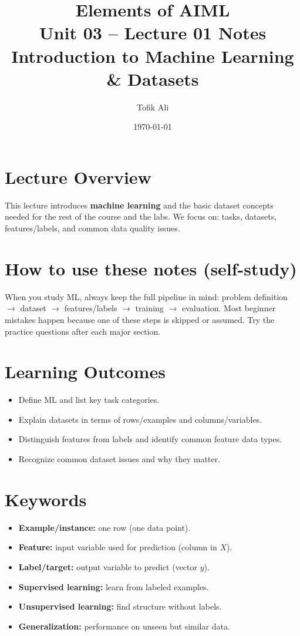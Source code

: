 \documentclass[11pt]{article}
\title{Elements of AIML\\Unit 03 -- Lecture 01 Notes\\Introduction to Machine Learning \& Datasets}
\author{Tofik Ali}
\date{\today}
\begin{document}
\maketitle
\tableofcontents

\section{Lecture Overview}
This lecture introduces \textbf{machine learning} and the basic dataset concepts needed for the rest of the course and the labs.
We focus on: tasks, datasets, features/labels, and common data quality issues.
\notesources{\AIMLUnitIIISources}

\section{How to use these notes (self-study)}
When you study ML, always keep the full pipeline in mind:
problem definition $\rightarrow$ dataset $\rightarrow$ features/labels $\rightarrow$ training $\rightarrow$ evaluation.
Most beginner mistakes happen because one of these steps is skipped or assumed.
Try the practice questions after each major section.

\section{Learning Outcomes}
\begin{itemize}[leftmargin=*]
  \item Define ML and list key task categories.
  \item Explain datasets in terms of rows/examples and columns/variables.
  \item Distinguish features from labels and identify common feature data types.
  \item Recognize common dataset issues and why they matter.
\end{itemize}

\section{Keywords}
\begin{itemize}[leftmargin=*]
  \item \textbf{Example/instance:} one row (one data point).
  \item \textbf{Feature:} input variable used for prediction (column in $X$).
  \item \textbf{Label/target:} output variable to predict (vector $y$).
  \item \textbf{Supervised learning:} learn from labeled examples.
  \item \textbf{Unsupervised learning:} find structure without labels.
  \item \textbf{Generalization:} performance on unseen but similar data.
\end{itemize}
\end{document}
